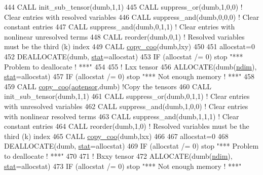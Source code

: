 \begin{DoxyCode}
444     \textcolor{keyword}{CALL }init\_sub\_tensor(dumb,1,1)
445     \textcolor{keyword}{CALL }suppress\_or(dumb,1,0,0) \textcolor{comment}{! Clear entries with resolved variables}
446     \textcolor{keyword}{CALL }suppress\_and(dumb,0,0,0) \textcolor{comment}{! Clear constant entries}
447     \textcolor{keyword}{CALL }suppress\_and(dumb,0,1,1) \textcolor{comment}{! Clear entries with nonlinear unresolved terms}
448     \textcolor{keyword}{CALL }reorder(dumb,0,1) \textcolor{comment}{! Resolved variables must be the third (k) index}
449     \textcolor{keyword}{CALL }\hyperlink{namespacetensor_a14f95c256cdf137ca0767ddb3c87deea}{copy\_coo}(dumb,lxy)
450 
451     allocstat=0
452     \textcolor{keyword}{DEALLOCATE}(dumb, \hyperlink{namespacestat}{stat}=allocstat)
453     \textcolor{keywordflow}{IF} (allocstat /= 0)  stop \textcolor{stringliteral}{"*** Problem to deallocate ! ***"}
454 
455     \textcolor{comment}{! Lxx tensor}
456     \textcolor{keyword}{ALLOCATE}(dumb(\hyperlink{namespaceparams_a2323fe1773f086e20c14f266351c482b}{ndim}), \hyperlink{namespacestat}{stat}=allocstat)
457     \textcolor{keywordflow}{IF} (allocstat /= 0) stop \textcolor{stringliteral}{"*** Not enough memory ! ***"}
458 
459     \textcolor{keyword}{CALL }\hyperlink{namespacetensor_a14f95c256cdf137ca0767ddb3c87deea}{copy\_coo}(\hyperlink{namespaceaotensor__def_a0dc43bc9294a18f2fe57b67489f1702f}{aotensor},dumb) \textcolor{comment}{!Copy the tensors}
460     \textcolor{keyword}{CALL }init\_sub\_tensor(dumb,1,1)
461     \textcolor{keyword}{CALL }suppress\_or(dumb,0,1,1) \textcolor{comment}{! Clear entries with unresolved variables}
462     \textcolor{keyword}{CALL }suppress\_and(dumb,1,0,0) \textcolor{comment}{! Clear entries with nonlinear resolved terms}
463     \textcolor{keyword}{CALL }suppress\_and(dumb,1,1,1) \textcolor{comment}{! Clear constant entries}
464     \textcolor{keyword}{CALL }reorder(dumb,1,0) \textcolor{comment}{! Resolved variables must be the third (k) index}
465     \textcolor{keyword}{CALL }\hyperlink{namespacetensor_a14f95c256cdf137ca0767ddb3c87deea}{copy\_coo}(dumb,lxx)
466 
467     allocstat=0
468     \textcolor{keyword}{DEALLOCATE}(dumb, \hyperlink{namespacestat}{stat}=allocstat)
469     \textcolor{keywordflow}{IF} (allocstat /= 0)  stop \textcolor{stringliteral}{"*** Problem to deallocate ! ***"}
470 
471     \textcolor{comment}{! Bxxy tensor}
472     \textcolor{keyword}{ALLOCATE}(dumb(\hyperlink{namespaceparams_a2323fe1773f086e20c14f266351c482b}{ndim}), \hyperlink{namespacestat}{stat}=allocstat)
473     \textcolor{keywordflow}{IF} (allocstat /= 0) stop \textcolor{stringliteral}{"*** Not enough memory ! ***"}

\end{DoxyCode}
